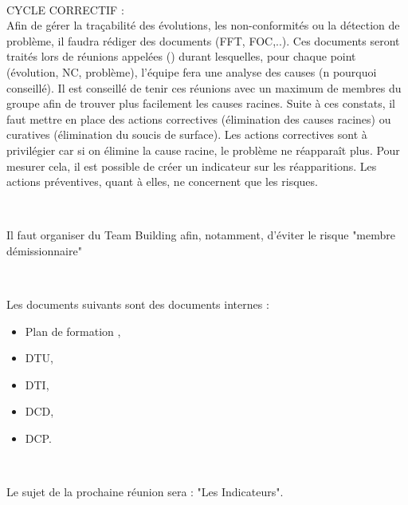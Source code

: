 \documentclass [a4paper] {article}
\begin{document}
~

CYCLE CORRECTIF : \\
Afin de gérer la traçabilité des évolutions, les non-conformités ou la détection de problème, il faudra rédiger des documents (FFT, FOC,..). Ces documents seront traités lors de réunions appelées \CTFT{} (\CTFTCourt) durant lesquelles, pour chaque point (évolution, NC, problème), l'équipe fera une analyse des causes (n pourquoi conseillé). Il est conseillé de tenir ces réunions avec un maximum de membres du groupe afin de trouver plus facilement les causes racines. Suite à ces constats, il faut mettre en place des actions correctives (élimination des causes racines) ou curatives (élimination du soucis de surface). Les actions correctives sont à privilégier car si on élimine la cause racine, le problème ne réapparaît plus. Pour mesurer cela, il est possible de créer un indicateur sur les réapparitions. Les actions préventives, quant à elles, ne concernent que les risques.

~

Il faut organiser du Team Building afin, notamment, d'éviter le risque "membre démissionnaire"

~

Les documents suivants sont des documents internes :
\begin{itemize}
\item Plan de formation ,
\item DTU, 
\item DTI, 
\item DCD, 
\item DCP.
\end{itemize}

~

Le sujet de la prochaine réunion sera : "Les Indicateurs".



\end{document}
